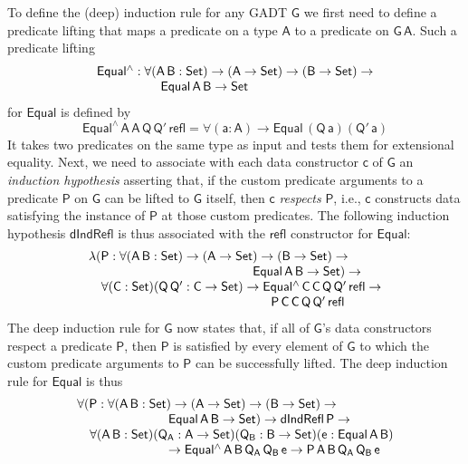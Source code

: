 \documentclass[sigplan,10pt,anonymous,review]{acmart}
\begin{document}
To define the (deep) induction rule for any GADT $\mathsf{G}$ we first
need to define a predicate lifting that maps a predicate on a type
$\mathsf{A}$ to a predicate on $\mathsf{G\,A}$. Such a predicate
lifting
\[\begin{array}{l}
\mathsf{Equal^{\wedge} : \forall (A\,B : Set) \to (A \to Set)
  \to (B \to Set) \to}\\
\mathsf{\hspace*{0.7in}Equal\,A\,B \to Set}
\end{array}\]
for $\mathsf{Equal}$ is defined by
\[\mathsf{Equal^{\wedge}\,A\,A\,Q\,Q'\,refl = \forall (a :
  A) \to Equal\,(Q\,a)(Q'\,a)}\]
It takes two predicates on the same type as input and tests them for
extensional equality.  Next, we need to associate with each data
constructor $\mathsf{c}$ of $\mathsf{G}$ an {\em induction hypothesis}
asserting that, if the custom predicate arguments to a predicate
$\mathsf{P}$ on $\mathsf{G}$ can be lifted to $\mathsf{G}$ itself,
then $\mathsf{c}$ {\em respects} $\mathsf{P}$, i.e., $\mathsf{c}$
constructs data satisfying the instance of $\mathsf{P}$ at those
custom predicates. The following induction hypothesis
$\mathsf{dIndRefl}$ is thus associated with the $\mathsf{refl}$
constructor for $\mathsf{Equal}$:
\begin{equation*}\label{eq:ind-refl}
\begin{array}{l}
\mathsf{\lambda (P : \forall (A\,B : Set) \to (A \to Set) \to (B \to
  Set) \to}\\
\mathsf{\hspace*{1.8in}Equal\,A\,B \to Set) \to} \\ 
\quad\mathsf{\forall (C : Set) (Q\, Q' : C \to Set) \to
  Equal^{\wedge}\,C\,C\,Q\,Q'\,refl \to}\\
\mathsf{\hspace*{2in}P\,C\,C\,Q\,Q'\,refl} 
\end{array}
\end{equation*}
The deep induction rule for $\mathsf{G}$ now states that, if all of
$\mathsf{G}$'s data constructors respect a predicate $\mathsf{P}$,
then $\mathsf{P}$ is satisfied by every element of $\mathsf{G}$ to
which the custom predicate arguments to $\mathsf{P}$ can be
successfully lifted.  The deep induction rule for $\mathsf{Equal}$ is
thus
\begin{equation}\label{eq:ind-equal}
\begin{array}{l}
\mathsf{\forall (P : \forall (A\,B : Set) \to (A \to Set) \to (B \to
  Set) \to}\\
\mathsf{\hspace*{1in}Equal\,A\,B \to Set) \to dIndRefl\,P \to}\\ \quad 
\mathsf{\forall (A\,B : Set) (Q_A : A \to Set) (Q_B : B \to Set)(e:
  Equal\,A\,B)}\\
\mathsf{\hspace*{1in}\to Equal^{\wedge}\,A\,B\,Q_A\,Q_B\,e \to
  P\,A\,B\,Q_A\,Q_B\,e}\\ 
\mathsf{\hspace*{2in} }
\end{array}
\end{equation}
\end{document}
